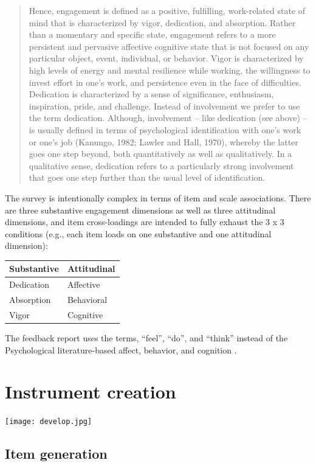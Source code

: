\documentclass[
]{book}
\begin{document}
\begin{quote}
Hence, engagement is defined as a positive, fulfilling, work-related state of mind that is characterized by vigor, dedication, and absorption. Rather than a momentary and specific state, engagement refers to a more persistent and pervasive affective cognitive state that is not focused on any particular object, event, individual, or behavior. Vigor is characterized by high levels of energy and mental resilience while working, the willingness to invest effort in one's work, and persistence even in the face of difficulties. Dedication is characterized by a sense of significance, enthusiasm, inspiration, pride, and challenge. Instead of involvement we prefer to use the term dedication. Although, involvement -- like dedication (see above) -- is usually defined in terms of psychological identification with one's work or one's job (Kanungo, 1982; Lawler and Hall, 1970), whereby the latter goes one step beyond, both quantitatively as well as qualitatively. In a qualitative sense, dedication refers to a particularly strong involvement that goes one step further than the usual level of identification.
\end{quote}

The survey is intentionally complex in terms of item and scale associations. There are three substantive engagement dimensions as well as three attitudinal dimensions, and item cross-loadings are intended to fully exhaust the 3 x 3 conditions (e.g., each item loads on one substantive and one attitudinal dimension):

\begin{longtable}[]{@{}ll@{}}
\toprule
Substantive & Attitudinal\tabularnewline
\midrule
\endhead
Dedication & Affective\tabularnewline
Absorption & Behavioral\tabularnewline
Vigor & Cognitive\tabularnewline
\bottomrule
\end{longtable}

The feedback report uses the terms, ``feel'', ``do'', and ``think'' instead of the Psychological literature-based affect, behavior, and cognition \citep[see, for example,][]{eagly_psychology_1993}.

\hypertarget{instrument-creation}{%
\chapter{Instrument creation}\label{instrument-creation}}

\texttt{[image: develop.jpg]}

\hypertarget{item-generation}{%
\section{Item generation}\label{item-generation}}
\end{document}
